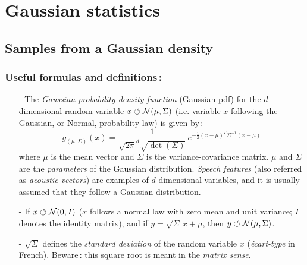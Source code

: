 \documentclass[twoside,a4paper,titlepage]{article}
\begin{document}
\clearpage

\tableofcontents

\bigskip
\section{Gaussian statistics}

\subsection{Samples from a Gaussian density}
\label{samples}

\subsubsection*{Useful formulas and definitions\,:}
\begin{itemize}
\item[-] The {\em Gaussian probability density function} (Gaussian pdf) for
the $d$-dimensional random variable $x \circlearrowleft {\cal
N}(\mu,\Sigma)$ (i.e. variable $x$ following the Gaussian, or Normal,
probability law) is given by\,:
\[
g_{(\mu,\Sigma)}(x) = \frac{1}{\sqrt{2\pi}^d \sqrt{\det\left(\Sigma\right)}}
\, e^{-\frac{1}{2} (x-\mu)^T \Sigma^{-1} (x-\mu)}
\]
where $\mu$ is the mean vector and $\Sigma$ is the variance-covariance
matrix. $\mu$ and $\Sigma$ are the {\em parameters} of the Gaussian
distribution. {\em Speech features} (also referred as {\em acoustic
vectors}) are examples of $d$-dimensional variables, and it is usually
assumed that they follow a Gaussian distribution.
%
\item[-] If $x \circlearrowleft {\cal N}(0,I)$ ($x$ follows a normal law
with zero mean and unit variance; $I$ denotes the identity matrix), and if
$y = \sqrt{\Sigma} \, x + \mu$, then $y \circlearrowleft {\cal
N}(\mu,\Sigma)$.
%
\item[-] $\sqrt{\Sigma}$ defines the {\em standard deviation} of the random
variable $x$ ({\em \'ecart-type} in French). Beware\,: this square root is
meant in the {\em matrix sense}.
\end{itemize}
\end{document}
